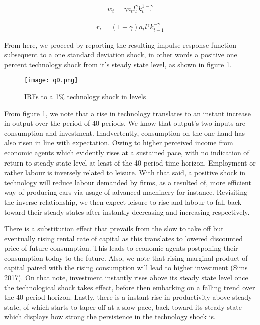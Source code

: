 \documentclass[
  11pt,
  justified]{article}
\begin{document}
\begin{align}
w_t = \gamma a_t l_t^{\gamma} k_{t-1}^{1 - \gamma} \tag{Wage}
\label{eq:wage}
\end{align}

\begin{align}
r_t = (1 - \gamma) a_t l^{\gamma} k_{t-1}^{- \gamma} \tag{Capital return}
\label{eq:capital_return}
\end{align}

From here, we proceed by reporting the resulting impulse response
function subsequent to a one standard deviation shock, in other words a
positive one percent technology shock from it's steady state level, as
shown in figure \ref{fig11}.

\begin{figure}
    \texttt{[image: qD.png]}
    \caption{IRFs to a 1\% technology shock in levels}
    \label{fig11}
\end{figure}

From figure \ref{fig11}, we note that a rise in technology translates to
an instant increase in output over the period of 40 periods. We know
that output's two inputs are consumption and investment. Inadvertently,
consumption on the one hand has also risen in line with expectation.
Owing to higher perceived income from economic agents which evidently
rises at a sustained pace, with no indication of return to steady state
level at least of the 40 period time horizon. Employment or rather
labour is inversely related to leisure. With that said, a positive shock
in technology will reduce labour demanded by firms, as a resulted of,
more efficient way of producing cars via usage of advanced machinery for
instance. Revisiting the inverse relationship, we then expect leisure to
rise and labour to fall back toward their steady states after instantly
decreasing and increasing respectively.

There is a substitution effect that prevails from the slow to take off
but eventually rising rental rate of capital as this translates to
lowered discounted price of future consumption. This leads to economic
agents postponing their consumption today to the future. Also, we note
that rising marginal product of capital paired with the rising
consumption will lead to higher investment
(\protect\hyperlink{ref-sims2017}{Sims 2017}). On that note, investment
instantly rises above its steady state level once the technological
shock takes effect, before then embarking on a falling trend over the 40
period horizon. Lastly, there is a instant rise in productivity above
steady state, of which starts to taper off at a slow pace, back toward
its steady state which displays how strong the persistence in the
technology shock is.
\end{document}
